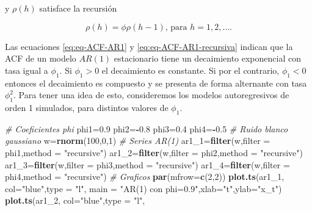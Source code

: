 \documentclass[12pt,]{krantz}
\makeatletter
\newenvironment{Shaded}{\begin{snugshade}}{\end{snugshade}}
\newcommand{\KeywordTok}[1]{\textcolor[rgb]{0.13,0.29,0.53}{\textbf{#1}}}
\newcommand{\DataTypeTok}[1]{\textcolor[rgb]{0.13,0.29,0.53}{#1}}
\newcommand{\DecValTok}[1]{\textcolor[rgb]{0.00,0.00,0.81}{#1}}
\newcommand{\FloatTok}[1]{\textcolor[rgb]{0.00,0.00,0.81}{#1}}
\newcommand{\StringTok}[1]{\textcolor[rgb]{0.31,0.60,0.02}{#1}}
\newcommand{\CommentTok}[1]{\textcolor[rgb]{0.56,0.35,0.01}{\textit{#1}}}
\newcommand{\OperatorTok}[1]{\textcolor[rgb]{0.81,0.36,0.00}{\textbf{#1}}}
\newcommand{\NormalTok}[1]{#1}
\newenvironment{kframe}{%
\medskip{}
\setlength{\fboxsep}{.8em}
 \def\at@end@of@kframe{}%
 \ifinner\ifhmode%
  \def\at@end@of@kframe{\end{minipage}}%
  \begin{minipage}{\columnwidth}%
 \fi\fi%
 \def\FrameCommand##1{\hskip\@totalleftmargin \hskip-\fboxsep
 \colorbox{shadecolor}{##1}\hskip-\fboxsep
     \hskip-\linewidth \hskip-\@totalleftmargin \hskip\columnwidth}%
 \MakeFramed {\advance\hsize-\width
   \@totalleftmargin\z@ \linewidth\hsize
   \@setminipage}}%
 {\par\unskip\endMakeFramed%
 \at@end@of@kframe}
\renewenvironment{Shaded}{\begin{kframe}}{\end{kframe}}
\theoremstyle{definition}
\theoremstyle{definition}
\theoremstyle{definition}
\theoremstyle{remark}
\makeatother
\begin{document}
y \(\rho(h)\) satisface la recursión

\begin{equation}
\rho(h) = \phi\rho(h-1)\text{, para }h=1,2,\ldots.
\label{eq:eq-ACF-AR1-recursiva}
\end{equation}

Las ecuaciones \eqref{eq:eq-ACF-AR1} y \eqref{eq:eq-ACF-AR1-recursiva}
indican que la ACF de un modelo \(AR(1)\) estacionario tiene un
decaimiento exponencial con tasa igual a \(\phi_1\). Si \(\phi_1>0\) el
decaimiento es constante. Si por el contrario, \(\phi_1<0\) entonces el
decaimiento es compuesto y se presenta de forma alternante con tasa
\(\phi_1^2\). Para tener una idea de esto, consideremos los modelos
autoregresivos de orden 1 simulados, para distintos valores de
\(\phi_1\).

\begin{Shaded}
\begin{Highlighting}[]
\CommentTok{# Coeficientes phi}
\NormalTok{phi1=}\FloatTok{0.9}
\NormalTok{phi2=}\OperatorTok{-}\FloatTok{0.8}
\NormalTok{phi3=}\FloatTok{0.4}
\NormalTok{phi4=}\OperatorTok{-}\FloatTok{0.5}
\CommentTok{# Ruido blanco gaussiano}
\NormalTok{w=}\KeywordTok{rnorm}\NormalTok{(}\DecValTok{100}\NormalTok{,}\DecValTok{0}\NormalTok{,}\DecValTok{1}\NormalTok{)}
\CommentTok{# Series AR(1)}
\NormalTok{ar1_}\DecValTok{1}\NormalTok{=}\KeywordTok{filter}\NormalTok{(w,}\DataTypeTok{filter =}\NormalTok{ phi1,}\DataTypeTok{method =} \StringTok{"recursive"}\NormalTok{)}
\NormalTok{ar1_}\DecValTok{2}\NormalTok{=}\KeywordTok{filter}\NormalTok{(w,}\DataTypeTok{filter =}\NormalTok{ phi2,}\DataTypeTok{method =} \StringTok{"recursive"}\NormalTok{)}
\NormalTok{ar1_}\DecValTok{3}\NormalTok{=}\KeywordTok{filter}\NormalTok{(w,}\DataTypeTok{filter =}\NormalTok{ phi3,}\DataTypeTok{method =} \StringTok{"recursive"}\NormalTok{)}
\NormalTok{ar1_}\DecValTok{4}\NormalTok{=}\KeywordTok{filter}\NormalTok{(w,}\DataTypeTok{filter =}\NormalTok{ phi4,}\DataTypeTok{method =} \StringTok{"recursive"}\NormalTok{)}
\CommentTok{# Graficos}
\KeywordTok{par}\NormalTok{(}\DataTypeTok{mfrow=}\KeywordTok{c}\NormalTok{(}\DecValTok{2}\NormalTok{,}\DecValTok{2}\NormalTok{))}
\KeywordTok{plot.ts}\NormalTok{(ar1_}\DecValTok{1}\NormalTok{, }\DataTypeTok{col=}\StringTok{"blue"}\NormalTok{,}\DataTypeTok{type =} \StringTok{"l"}\NormalTok{,}
     \DataTypeTok{main =} \StringTok{"AR(1) con phi=0.9"}\NormalTok{,}\DataTypeTok{xlab=}\StringTok{"t"}\NormalTok{,}\DataTypeTok{ylab=}\StringTok{"x_t"}\NormalTok{)}
\KeywordTok{plot.ts}\NormalTok{(ar1_}\DecValTok{2}\NormalTok{, }\DataTypeTok{col=}\StringTok{"blue"}\NormalTok{,}\DataTypeTok{type =} \StringTok{"l"}\NormalTok{,}

\end{Highlighting}
\end{Shaded}
\end{document}
